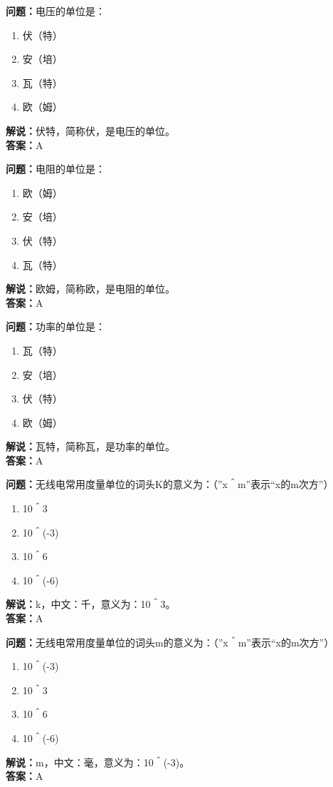 \documentclass{ctexbook}%
\begin{document}
\textbf{问题：}电压的单位是：
\begin{enumerate}[label=\Alph*), leftmargin=3em]
\item 伏（特）
\item 安（培）
\item 瓦（特）
\item 欧（姆）
\end{enumerate}
\textbf{解说：}伏特，简称伏，是电压的单位。\\
\textbf{答案：}A

\textbf{问题：}电阻的单位是：
\begin{enumerate}[label=\Alph*), leftmargin=3em]
\item 欧（姆）
\item 安（培）
\item 伏（特）
\item 瓦（特）
\end{enumerate}
\textbf{解说：}欧姆，简称欧，是电阻的单位。\\
\textbf{答案：}A

\textbf{问题：}功率的单位是：
\begin{enumerate}[label=\Alph*), leftmargin=3em]
\item 瓦（特）
\item 安（培）
\item 伏（特）
\item 欧（姆）
\end{enumerate}
\textbf{解说：}瓦特，简称瓦，是功率的单位。\\
\textbf{答案：}A

\textbf{问题：}无线电常用度量单位的词头K的意义为：（”x＾m”表示“x的m次方”）
\begin{enumerate}[label=\Alph*), leftmargin=3em]
\item 10＾3
\item 10＾(-3)
\item 10＾6
\item 10＾(-6)
\end{enumerate}
\textbf{解说：}k，中文：千，意义为：10＾3。\\
\textbf{答案：}A

\textbf{问题：}无线电常用度量单位的词头m的意义为：（”x＾m”表示“x的m次方”）
\begin{enumerate}[label=\Alph*), leftmargin=3em]
\item 10＾(-3)
\item 10＾3
\item 10＾6
\item 10＾(-6)
\end{enumerate}
\textbf{解说：}m，中文：毫，意义为：10＾(-3)。\\
\textbf{答案：}A
\end{document}
